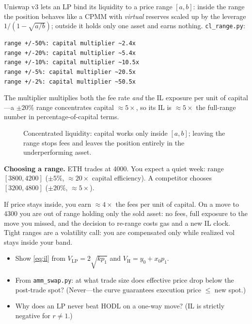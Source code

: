 Uniswap v3 lets an LP bind its liquidity to a price range $[a,b]$: inside the range the
position behaves like a CPMM with \emph{virtual} reserves scaled up by the leverage
$1/(1-\sqrt{a/b})$; outside it holds only one asset and earns nothing. \texttt{cl\_range.py}:
\begin{lstlisting}[numbers=none]
range +/-50%: capital multiplier ~2.4x
range +/-20%: capital multiplier ~5.4x
range +/-10%: capital multiplier ~10.5x
range +/-5%: capital multiplier ~20.5x
range +/-2%: capital multiplier ~50.5x
\end{lstlisting}
The multiplier multiplies both the fee rate \emph{and} the IL exposure per unit of
capital---a $\pm20\%$ range concentrates capital $\approx5\times$, so its IL is
$\approx5\times$ the full-range number in percentage-of-capital terms.

\begin{figure}[htbp]\centering

\caption{Concentrated liquidity: capital works only inside $[a,b]$; leaving the range stops
fees and leaves the position entirely in the underperforming asset.}
\label{fig:cl}
\end{figure}

\begin{example}\label{ex:range}
\textbf{Choosing a range.} ETH trades at 4000. You expect a quiet week: range $[3800,4200]$
($\pm5\%$, $\approx20\times$ capital efficiency). A competitor chooses $[3200,4800]$
($\pm20\%$, $\approx5\times$).
\begin{solution}
If price stays inside, you earn $\approx4\times$ the fees per unit of capital. On a move to
4300 you are out of range holding only the sold asset: no fees, full exposure to the move you
missed, and the decision to re-range costs gas and a new IL clock. Tight ranges are a
volatility call: you are compensated only while realized vol stays inside your band.
\end{solution}
\end{example}

\begin{checkpoint}
\begin{itemize}
\item Show \eqref{eq:il} from $V_{\mathrm{LP}}=2\sqrt{kp_1}$ and $V_{\mathrm{H}}=y_0+x_0p_1$.
\item From \texttt{amm\_swap.py}: at what trade size does effective price drop below the
post-trade spot? (Never---the curve guarantees execution price $\le$ new spot.)
\item Why does an LP never beat HODL on a one-way move? (IL is strictly negative for
$r\neq1$.)
\end{itemize}
\end{checkpoint}

